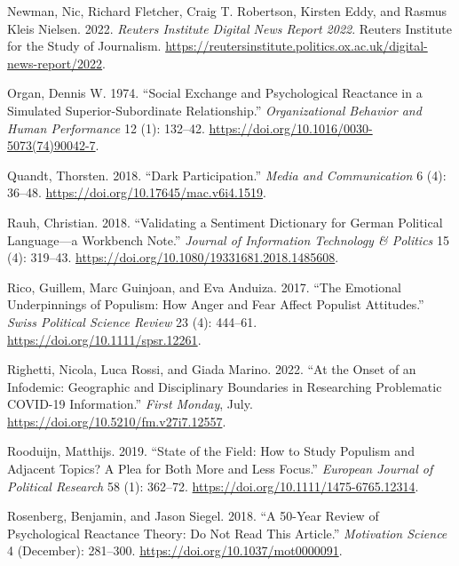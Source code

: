 \documentclass[
]{ccr}
\newlength{\cslhangindent}
\newlength{\cslentryspacingunit} %
\newenvironment{CSLReferences}[2] %
 {%
  \setlength{\parindent}{0pt}
  \ifodd #1
  \let\oldpar\par
  \def\par{\hangindent=\cslhangindent\oldpar}
  \fi
  \setlength{\parskip}{#2\cslentryspacingunit}
 }%
 {}
\begin{document}
\begin{CSLReferences}{1}{0}
\leavevmode{}%
Newman, Nic, Richard Fletcher, Craig T. Robertson, Kirsten Eddy, and
Rasmus Kleis Nielsen. 2022. \emph{Reuters Institute Digital News Report
2022}. {Reuters Institute for the Study of Journalism}.
\url{https://reutersinstitute.politics.ox.ac.uk/digital-news-report/2022}.

\leavevmode{}%
Organ, Dennis W. 1974. {``Social Exchange and Psychological Reactance in
a Simulated Superior-Subordinate Relationship.''} \emph{Organizational
Behavior and Human Performance} 12 (1): 132--42.
\url{https://doi.org/10.1016/0030-5073(74)90042-7}.

\leavevmode{}%
Quandt, Thorsten. 2018. {``Dark Participation.''} \emph{Media and
Communication} 6 (4): 36--48.
\url{https://doi.org/10.17645/mac.v6i4.1519}.

\leavevmode{}%
Rauh, Christian. 2018. {``Validating a Sentiment Dictionary for {German}
Political Language---a Workbench Note.''} \emph{Journal of Information
Technology \& Politics} 15 (4): 319--43.
\url{https://doi.org/10.1080/19331681.2018.1485608}.

\leavevmode{}%
Rico, Guillem, Marc Guinjoan, and Eva Anduiza. 2017. {``The {Emotional
Underpinnings} of {Populism}: {How Anger} and {Fear Affect Populist
Attitudes}.''} \emph{Swiss Political Science Review} 23 (4): 444--61.
\url{https://doi.org/10.1111/spsr.12261}.

\leavevmode{}%
Righetti, Nicola, Luca Rossi, and Giada Marino. 2022. {``At the Onset of
an Infodemic: {Geographic} and Disciplinary Boundaries in Researching
Problematic {COVID-19} Information.''} \emph{First Monday}, July.
\url{https://doi.org/10.5210/fm.v27i7.12557}.

\leavevmode{}%
Rooduijn, Matthijs. 2019. {``State of the Field: {How} to Study Populism
and Adjacent Topics? {A} Plea for Both More and Less Focus.''}
\emph{European Journal of Political Research} 58 (1): 362--72.
\url{https://doi.org/10.1111/1475-6765.12314}.

\leavevmode{}%
Rosenberg, Benjamin, and Jason Siegel. 2018. {``A 50-{Year Review} of
{Psychological Reactance Theory}: {Do Not Read This Article}.''}
\emph{Motivation Science} 4 (December): 281--300.
\url{https://doi.org/10.1037/mot0000091}.


\end{CSLReferences}
\end{document}
